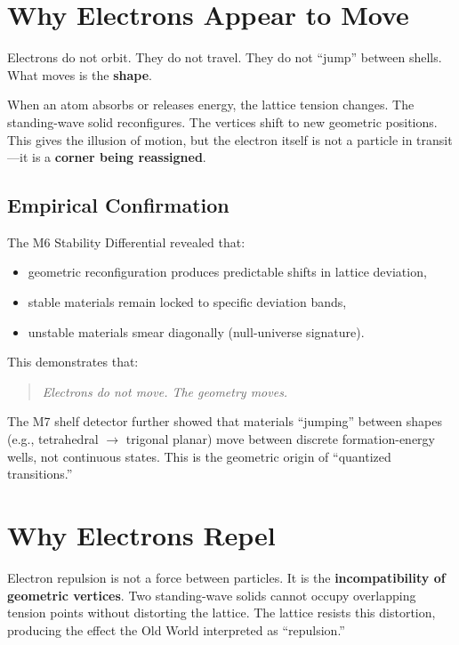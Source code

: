 \documentclass[11pt, letterpaper, openany]{book}
\begin{document}
\section{Why Electrons Appear to Move}

Electrons do not orbit. They do not travel. They do not “jump” between shells. What moves
is the \textbf{shape}.

When an atom absorbs or releases energy, the lattice tension changes. The standing-wave
solid reconfigures. The vertices shift to new geometric positions. This gives the illusion of
motion, but the electron itself is not a particle in transit—it is a \textbf{corner being
reassigned}.

\subsection*{Empirical Confirmation}

The M6 Stability Differential revealed that:

\begin{itemize}
    \item geometric reconfiguration produces predictable shifts in lattice deviation,
    \item stable materials remain locked to specific deviation bands,
    \item unstable materials smear diagonally (null-universe signature).
\end{itemize}

This demonstrates that:

\begin{quote}
\textit{Electrons do not move. The geometry moves.}
\end{quote}

The M7 shelf detector further showed that materials “jumping” between shapes (e.g.,
tetrahedral $\rightarrow$ trigonal planar) move between discrete formation-energy wells,
not continuous states. This is the geometric origin of “quantized transitions.”

\section{Why Electrons Repel}

Electron repulsion is not a force between particles. It is the \textbf{incompatibility of geometric
vertices}. Two standing-wave solids cannot occupy overlapping tension points without
distorting the lattice. The lattice resists this distortion, producing the effect the Old World
interpreted as “repulsion.”
\end{document}
